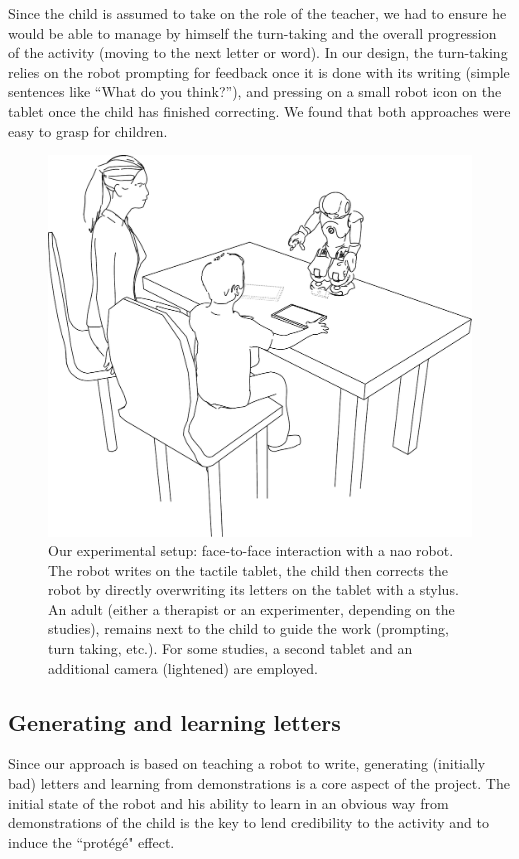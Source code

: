 \documentclass{sig-alternate}
\begin{document}
Since the child is assumed to take on the role of the teacher, we had to ensure
he would be able to manage by himself the turn-taking and the overall
progression of the activity (moving to the next letter or word). In our design,
the turn-taking relies on the robot prompting for feedback once it is done with
its writing (simple sentences like ``What do you think?''), and pressing on a
small robot icon on the tablet once the child has finished correcting. We found that both approaches were easy to grasp for children.


   \begin{figure}
       \centering
       \includegraphics[width=0.6\columnwidth]{experimental_setup}
       \caption{\small Our experimental setup: face-to-face interaction with a {\sc
           nao} robot.  The robot writes on the tactile tablet, the child then
           corrects the robot by directly overwriting its letters on the tablet
           with a stylus. An adult (either a therapist or an experimenter,
           depending on the studies), remains next to the child to guide the work
           (prompting, turn taking, etc.). For some studies, a second tablet and an
           additional camera (lightened) are employed.}

       \label{experimental_setup}
   \end{figure}

\subsection{Generating and learning letters}
Since our approach is based on teaching a robot to write, generating (initially
bad) letters and learning from demonstrations is a core aspect of the project.
The initial state of the robot and his ability to learn in an obvious way
from demonstrations of the child is the key to lend credibility to the activity and to induce the ``prot\'eg\'e" effect.
\end{document}
